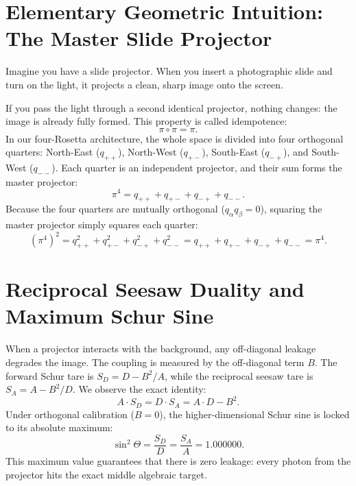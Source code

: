 \documentclass[11pt,a4paper]{article}
\theoremstyle{definition}
\begin{document}
\section{Elementary Geometric Intuition: The Master Slide Projector}

Imagine you have a slide projector. When you insert a photographic slide and turn on the light, it projects a clean, sharp image onto the screen.

If you pass the light through a second identical projector, nothing changes: the image is already fully formed. This property is called idempotence:
\begin{equation}
\pi \circ \pi = \pi.
\end{equation}
In our four-Rosetta architecture, the whole space is divided into four orthogonal quarters: North-East ($q_{++}$), North-West ($q_{+-}$), South-East ($q_{-+}$), and South-West ($q_{--}$). Each quarter is an independent projector, and their sum forms the master projector:
\begin{equation}
\pi^4 = q_{++} + q_{+-} + q_{-+} + q_{--}.
\end{equation}
Because the four quarters are mutually orthogonal ($q_\alpha q_\beta = 0$), squaring the master projector simply squares each quarter:
\begin{equation}
(\pi^4)^2 = q_{++}^2 + q_{+-}^2 + q_{-+}^2 + q_{--}^2 = q_{++} + q_{+-} + q_{-+} + q_{--} = \pi^4.
\end{equation}

\section{Reciprocal Seesaw Duality and Maximum Schur Sine}

When a projector interacts with the background, any off-diagonal leakage degrades the image. The coupling is measured by the off-diagonal term $B$. The forward Schur tare is $S_D = D - B^2 / A$, while the reciprocal seesaw tare is $S_A = A - B^2 / D$. We observe the exact identity:
\begin{equation}
A \cdot S_D = D \cdot S_A = A \cdot D - B^2.
\end{equation}
Under orthogonal calibration ($B = 0$), the higher-dimensional Schur sine is locked to its absolute maximum:
\begin{equation}
\sin^2\Theta = \frac{S_D}{D} = \frac{S_A}{A} = 1.000000.
\end{equation}
This maximum value guarantees that there is zero leakage: every photon from the projector hits the exact middle algebraic target.
\end{document}
